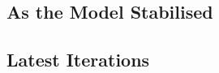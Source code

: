 
\subsection{As the Model Stabilised} %
\label{sub:as_the_model_stabilised}


\subsection{Latest Iterations} %
\label{sub:latest_iterations}





